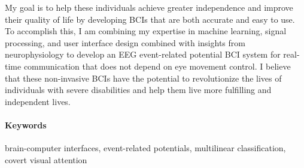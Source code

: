 \documentclass[10pt,a4paper]{article}
\begin{document}
My goal is to help these individuals achieve greater independence and improve their quality of life by developing BCIs that are both accurate and easy to use. To accomplish this, I am combining my expertise in machine learning, signal processing, and user interface design combined with insights from neurophysiology to develop an EEG event-related potential BCI system for real-time communication that does not depend on eye movement control. I believe that these non-invasive BCIs have the potential to revolutionize the lives of individuals with severe disabilities and help them live more fulfilling and independent lives.

\paragraph{Keywords} brain-computer interfaces, event-related
potentials, multilinear classification, covert visual attention
\end{document}
